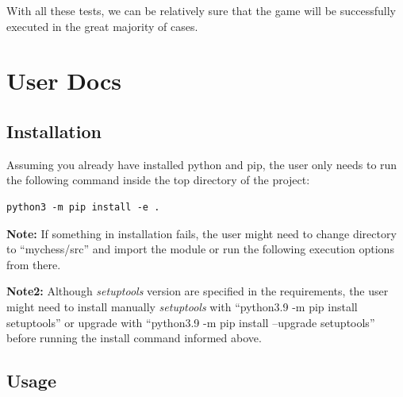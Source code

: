 \documentclass[10pt]{article}
\begin{document}
With all these tests, we can be relatively sure that the game will be successfully
executed in the great majority of cases.



\section{User Docs}

\subsection{Installation}

Assuming you already have installed python and pip, the user only needs to run
the following command inside the top directory of the project:
\begin{lstlisting}
python3 -m pip install -e .
\end{lstlisting}

\textbf{Note:}
        If something in installation fails, the user might need to change directory to
        ``mychess/src'' and import the module or run the following execution options
        from there.

        \textbf{Note2:} Although \textit{setuptools} version are specified in the requirements, the
        user might need to install manually \textit{setuptools} with ``python3.9 -m pip
        install setuptools'' or upgrade with ``python3.9 -m pip install
        --upgrade setuptools'' before running the install command
        informed above.


\subsection{Usage}
\end{document}
